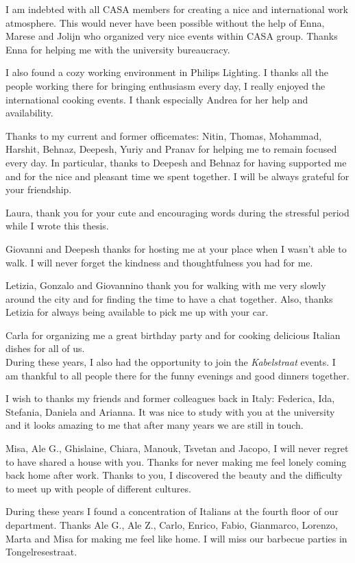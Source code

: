 I am indebted with all CASA members for creating a nice and international work atmosphere. This would never have been possible without the help of Enna, Marese and Jolijn who organized very nice events within CASA group. Thanks Enna for helping me with the university bureaucracy.

I also found a cozy working environment in Philips Lighting. I thanks all the people working there for bringing enthusiasm every day, I really enjoyed the international cooking events. I thank especially Andrea for her help and availability.

Thanks to my current and former officemates: Nitin, Thomas, Mohammad, Harshit, Behnaz, Deepesh, Yuriy and Pranav for helping me to remain focused every day.
In particular, thanks to Deepesh and Behnaz for having supported me and for the nice and pleasant time we spent together. I will be always grateful for your friendship. 

Laura, thank you for your cute and encouraging words during the stressful period while I wrote this thesis.

Giovanni and Deepesh thanks for hosting me at your place when I wasn't able to walk. I will never forget the kindness and thoughtfulness you had for me.


Letizia, Gonzalo and Giovannino thank you for walking with me very slowly around the city and for finding the time to have a chat together. Also, thanks Letizia for always being available to pick me up with your car.

Carla for organizing me a great birthday party and for cooking delicious Italian dishes for all of us. \\

During these years, I also had the opportunity to join the \emph{Kabelstraat} events. I am thankful to all people there for the funny evenings and good dinners together.

I wish to thanks my friends and former colleagues back in Italy: Federica, Ida, Stefania, Daniela and Arianna. It was nice to study with you at the university and it looks amazing to me that after many years we are still in touch.

Misa, Ale G., Ghislaine, Chiara, Manouk, Tsvetan and Jacopo, I will never regret to have shared a house with you. Thanks for never making me feel lonely coming back home after work. Thanks to you, I discovered the beauty and the difficulty to meet up with people of different cultures.

During these years I found a concentration of Italians at the fourth floor of our department. Thanks Ale G., Ale Z., Carlo, Enrico, Fabio, Gianmarco, Lorenzo, Marta and Misa for making me feel like home. I will miss our barbecue parties in Tongelresestraat.\\

